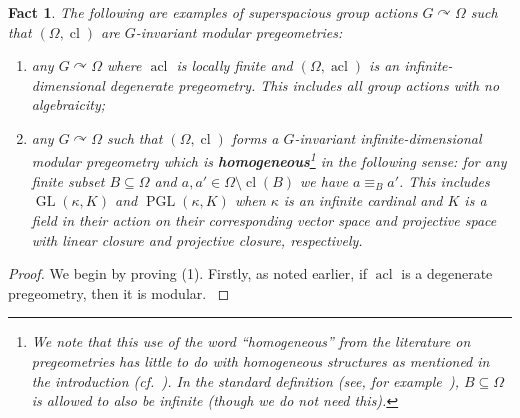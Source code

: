 \documentclass{article}
\newtheorem{fact}[theorem]{Fact}
\theoremstyle{remark}
\theoremstyle{definition}
\def\acts{\curvearrowright}
\newcommand{\repau}[1]{\textcolor{ForestGreen}{PM: #1}}
\DeclareMathOperator{\cl}{cl}
\DeclareMathOperator{\acl}{acl}
\DeclareMathOperator{\GL}{GL}
\DeclareMathOperator{\PGL}{PGL}
\def\Ind#1#2{#1\setbox0=\hbox{$#1x$}\kern\wd0\hbox to 0pt{\hss$#1\mid$\hss}
	\lower.9\ht0\hbox to 0pt{\hss$#1\smile$\hss}\kern\wd0}
\def\ind{\mathop{\mathpalette\Ind{}}}
\begin{document}
{%


\begin{fact}\label{fact:superspacious} The following are examples of superspacious group actions  $G\acts\Omega$ such that $(\Omega, {\cl})$ are $G$-invariant modular pregeometries: %
\begin{enumerate}
    \item any $G\acts\Omega$ where $\acl$ is locally finite and  $(\Omega, \acl)$ is an infinite-dimensional degenerate pregeometry. This includes all group actions with no algebraicity;
    \item any $G\acts\Omega$ such that $(\Omega, {\cl})$ forms a {$G$-invariant} infinite-dimensional modular pregeometry %
     which is \textbf{homogeneous}\footnote{{We note that this use of the word ``homogeneous''  from the literature on pregeometries has little to do with homogeneous structures as mentioned in the introduction (cf.~\cite{homogeneous}). In the standard definition (see, for example~\cite[$\S 2$ Definition 1.1]{pillay1996geometric}), $B\subseteq\Omega$ is allowed to also be infinite (though we do not need this).}} in the following sense: for any %
    {finite} subset $B\subseteq \Omega$ and $a,a'\in \Omega\setminus {\cl(B)}$ we have $a\equiv_B a'$. This includes $\GL(\kappa, K)$ and $\PGL(\kappa, K)$ when $\kappa$ is an infinite cardinal and $K$ is a field in their action on their corresponding vector space and projective space {with linear closure and projective closure, respectively.}%
\end{enumerate}
\end{fact}
\begin{proof} %
{We begin by proving (1). Firstly, as noted earlier, if $\acl$ is a degenerate pregeometry, then it is modular.
}
\end{proof}}
\end{document}
